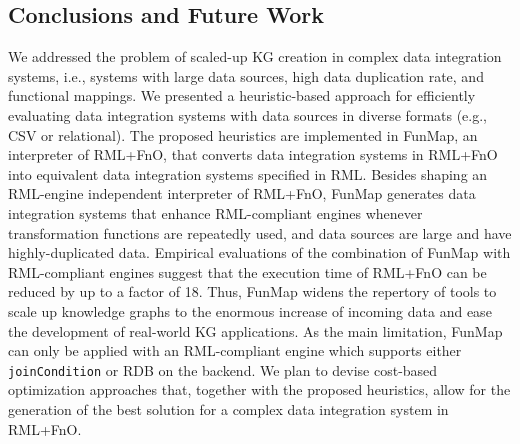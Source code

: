 \subsection{Conclusions and Future Work}
\label{sec:conclusions}
We addressed the problem of scaled-up KG creation in complex data integration systems, i.e., systems with large data sources, high data duplication rate, and functional mappings. 
We presented a heuristic-based approach for efficiently evaluating data integration systems with data sources in diverse formats (e.g., CSV or relational). The proposed heuristics are implemented in FunMap, an interpreter of RML+FnO, that converts data integration systems in RML+FnO into equivalent data integration systems specified in RML. Besides shaping an RML-engine independent interpreter of RML+FnO, FunMap generates data integration systems that enhance RML-compliant engines whenever transformation functions are repeatedly used, and data sources are large and have highly-duplicated data. Empirical evaluations of the combination of FunMap with RML-compliant engines suggest that the execution time of RML+FnO can be reduced by up to a factor of 18. Thus, FunMap widens the repertory of tools to scale up knowledge graphs to the enormous increase of incoming data and ease the development of real-world KG applications. As the main limitation, FunMap can only be applied with an RML-compliant engine which supports either \verb|joinCondition| or RDB on the backend. We plan to devise cost-based optimization approaches that, together with the proposed heuristics, allow for the generation of the best solution for a complex data integration system in RML+FnO. 